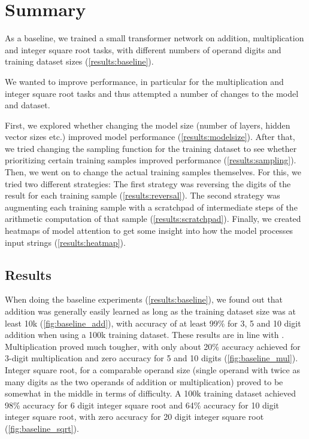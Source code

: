 \section{Summary}

As a baseline, we trained a small transformer network on addition, multiplication and integer square root tasks, with different numbers of operand digits and training dataset sizes (\cref{results:baseline}).

We wanted to improve performance, in particular for the multiplication and integer square root tasks and thus attempted a number of changes to the model and dataset.

First, we explored whether changing the model size (number of layers, hidden vector sizes etc.) improved model performance (\cref{results:modelsize}).
After that, we tried changing the sampling function for the training dataset to see whether prioritizing certain training samples improved performance (\cref{results:sampling}).
Then, we went on to change the actual training samples themselves. For this, we tried two different strategies:
The first strategy was reversing the digits of the result for each training sample (\cref{results:reversal}).
The second strategy was augmenting each training sample with a scratchpad of intermediate steps of the arithmetic computation of that sample (\cref{results:scratchpad}).
Finally, we created heatmaps of model attention to get some insight into how the model processes input strings (\cref{results:heatmap}).

\subsection{Results}
When doing the baseline experiments (\cref{results:baseline}), we found out that addition was generally easily learned as long as the training dataset size was at least 10k (\cref{fig:baseline_add}), with accuracy of at least 99\% for 3, 5 and 10 digit addition when using a 100k training dataset. These results are in line with \cite{teaching}.
Multiplication proved much tougher, with only about 20\% accuracy achieved for 3-digit multiplication and zero accuracy for 5 and 10 digits (\cref{fig:baseline_mul}).
Integer square root, for a comparable operand size (single operand with twice as many digits as the two operands of addition or multiplication) proved to be somewhat in the middle in terms of difficulty. A 100k training dataset achieved 98\% accuracy for 6 digit integer square root and 64\% accuracy for 10 digit integer square root, with zero accuracy for 20 digit integer square root (\cref{fig:baseline_sqrt}).

